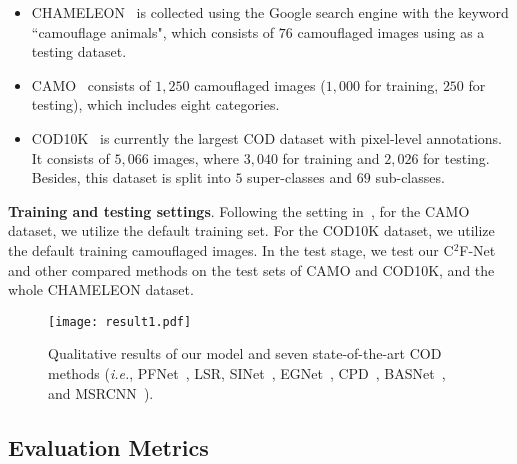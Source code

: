 \documentclass[lettersize,journal]{IEEEtran}
\newcommand{\our}{{C$^2$F-Net}}
\def\ie{\emph{i.e.}}
\begin{document}
\begin{itemize}
	\item CHAMELEON~\cite{sinet} is collected using the Google search engine with the keyword ``camouflage animals", which consists of $76$ camouflaged images using as a testing dataset. 
	
	\item CAMO~\cite{anet} consists of $1,250$ camouflaged images ($1,000$ for training, $250$ for testing), which includes eight categories.
	
	\item COD10K~\cite{sinet} is currently the largest COD dataset with pixel-level annotations. It consists of $5,066$ images, where $3,040$ for training and $2,026$ for testing. Besides, this dataset is split into $5$ super-classes and $69$ sub-classes. 
\end{itemize}


\textbf{Training and testing settings}. Following the setting in~\cite{sinet}, for the CAMO dataset, we utilize the default training set. For the COD10K dataset, we utilize the default training camouflaged images. In the test stage, we test our \our~ and other compared methods on the test sets of CAMO and COD10K, and the whole CHAMELEON dataset.

\begin{figure*}[ht]
	\begin{centering}
		\texttt{[image: result1.pdf]}%
		\vspace{-5pt}
		\caption{Qualitative results of our model and seven state-of-the-art COD methods (\ie, %
			PFNet~\cite{pfnet}, LSR\cite{lsr}, SINet~\protect\cite{sinet}, EGNet~\protect\cite{egnet}, CPD~\protect\cite{cpd}, BASNet~\protect\cite{basnet}, and MSRCNN~\protect\cite{masksrcnn}).
		}
		\label{results}
	\end{centering}%
\end{figure*}

\subsection{Evaluation Metrics}\label{metrics}
\end{document}
